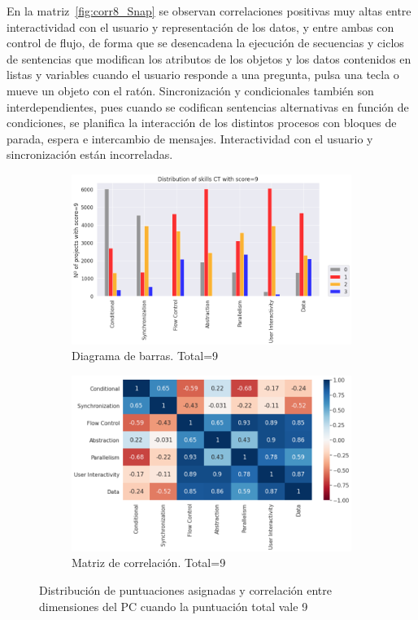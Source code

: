 \documentclass[a4paper, 12pt]{book}
\begin{document}
En la matriz~\ref{fig:corr8_Snap} se observan correlaciones positivas muy altas entre interactividad con el usuario y representación de los datos, y entre ambas con control de flujo, de forma que se desencadena la ejecución de secuencias y ciclos de sentencias que modifican los atributos de los objetos y los datos contenidos en listas y variables cuando el usuario responde a una pregunta, pulsa una tecla o mueve un objeto con el ratón. Sincronización y condicionales también son interdependientes, pues cuando se codifican sentencias alternativas en función de condiciones, se planifica la interacción de los distintos procesos con bloques de parada, espera e intercambio de mensajes. Interactividad con el usuario y sincronización están incorreladas.

\begin{figure}[H]
    \centering
    \begin{subfigure}[h]{.49\textwidth} 
        \includegraphics[width=\textwidth]{img/distribucion_9_Snap}
        \caption{Diagrama de barras. Total=9}
        \label{fig:total9_Snap}
    \end{subfigure}       
    \begin{subfigure}[h]{.49\textwidth} 
        \includegraphics[width=\textwidth]{img/corr_9_Snap}
        \caption{Matriz de correlación. Total=9}
        \label{fig:corr9_Snap}
    \end{subfigure}
    \caption{Distribución de puntuaciones asignadas y correlación entre dimensiones del PC cuando la puntuación total vale 9}
\end{figure}
  
\end{document}
